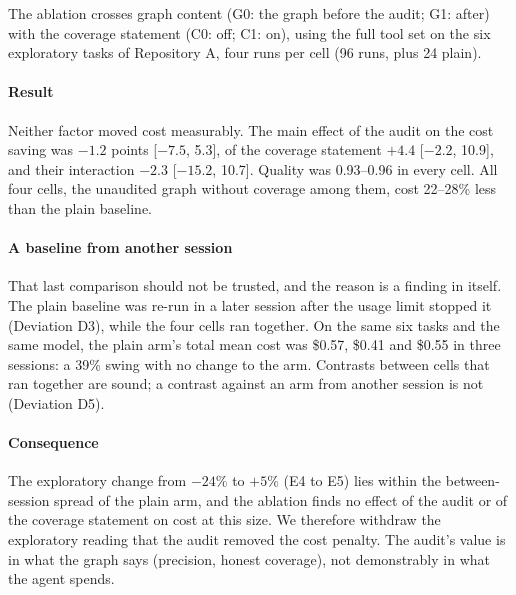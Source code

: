 The ablation crosses graph content (G0: the graph before the audit; G1: after) with the coverage statement (C0: off;
C1: on), using the full tool set on the six exploratory tasks of Repository A, four runs per cell (96 runs, plus 24
plain).

\paragraph{Result} Neither factor moved cost measurably. The main effect of the audit on the cost saving was $-1.2$
points [$-7.5$, 5.3], of the coverage statement $+4.4$ [$-2.2$, 10.9], and their interaction $-2.3$ [$-15.2$, 10.7].
Quality was 0.93--0.96 in every cell. All four cells, the unaudited graph without coverage among them, cost 22--28\%
less than the plain baseline.

\paragraph{A baseline from another session} That last comparison should not be trusted, and the reason is a finding in
itself. The plain baseline was re-run in a later session after the usage limit stopped it (Deviation D3), while the
four cells ran together. On the same six tasks and the same model, the plain arm's total mean cost was \$0.57, \$0.41
and \$0.55 in three sessions: a 39\% swing with no change to the arm. Contrasts between cells that ran together are
sound; a contrast against an arm from another session is not (Deviation D5).

\paragraph{Consequence} The exploratory change from $-24\%$ to $+5\%$ (E4 to E5) lies within the between-session spread
of the plain arm, and the ablation finds no effect of the audit or of the coverage statement on cost at this size. We
therefore withdraw the exploratory reading that the audit removed the cost penalty. The audit's value is in what the
graph says (precision, honest coverage), not demonstrably in what the agent spends.
